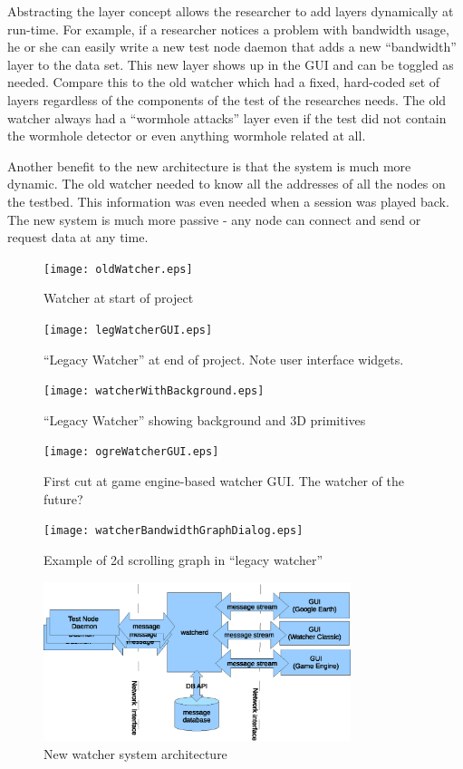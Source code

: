 \documentclass{report}
\begin{document}
Abstracting the layer concept allows the researcher to add layers dynamically at run-time. For example, 
if a researcher notices a problem with bandwidth usage, he or she can easily write a new test node daemon that 
adds a new ``bandwidth'' layer to the data set. This new layer shows up in the GUI and can be toggled as needed. 
Compare this to the old watcher which had a fixed, hard-coded set of layers regardless of the components of the test
of the researches needs. The old watcher always had a ``wormhole attacks'' layer even if the test did not 
contain the wormhole detector or even anything wormhole related at all. 

Another benefit to the new architecture is that the system is much more dynamic. The old watcher needed to know all the addresses of all the nodes
on the testbed. This information was even needed when a session was played back. The new system is much more passive - any node can connect and 
send or request data at any time. 

\begin{figure}
\label{fig:oldWatcher}
\centering
\texttt{[image: oldWatcher.eps]}
\caption{Watcher at start of project}
\end{figure}

\begin{figure}
\label{fig:legWatcherGUI}
\centering
\texttt{[image: legWatcherGUI.eps]}
\caption{``Legacy Watcher'' at end of project. Note user interface widgets.}
\end{figure}

\begin{figure}
\label{fig:watcherWithBackground}
\centering
\texttt{[image: watcherWithBackground.eps]}
\caption{``Legacy Watcher'' showing background and 3D primitives}
\end{figure}

\begin{figure}
\label{fig:ogreWatcherGUI}
\centering
\texttt{[image: ogreWatcherGUI.eps]}
\caption{First cut at game engine-based watcher GUI. The watcher of the future?}
\end{figure}

\begin{figure}
\label{fig:watcherBandwidthGraphDialog}
\centering
\texttt{[image: watcherBandwidthGraphDialog.eps]}
\caption{Example of 2d scrolling graph in ``legacy watcher''}
\end{figure}

\begin{figure}
\label{fig:watcherArch}
\centering
\includegraphics[width=0.8\textwidth]{watcherArch.eps}
\caption{New watcher system architecture}
\end{figure}
\end{document}
